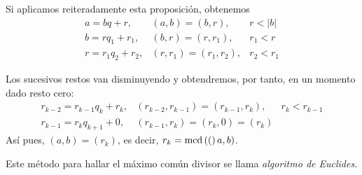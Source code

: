 Si aplicamos reiteradamente esta proposición, obtenemos
$$\begin{array}{lll}
    a = bq + r,       & (a,b)=(b,r),       & r<|b|   \\
    b = rq_1 + r_1,   & (b,r)=(r,r_1),     & r_1<r   \\
    r = r_1q_2 + r_2, & (r,r_1)=(r_1,r_2), & r_2<r_1
\end{array}$$

Los sucesivos restos van disminuyendo y obtendremos, por tanto, en un momento dado resto cero:
$$\begin{array}{lll}
    r_{k-2} = r_{k-1}q_k + r_k, & (r_{k-2},r_{k-1})=(r_{k-1},r_k),  & r_k<r_{k-1}   \\
    r_{k-1} = r_kq_{k+1} + 0,   & (r_{k-1},r_k)=(r_k,0)=(r_k)       & 
\end{array}$$
Así pues, $(a,b)=(r_k)$, es decir, $r_k=\operatorname{\rm mcd}\left((\right)a,b)$.

Este método para hallar el máximo común divisor se llama {\it algoritmo de Euclides}.